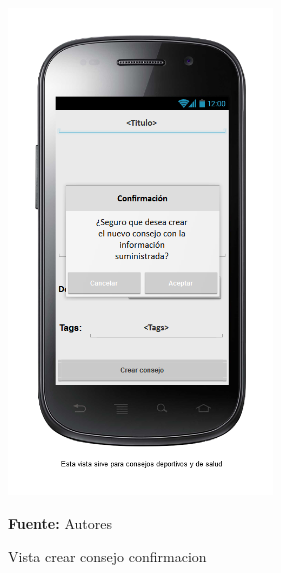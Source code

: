 \begin{figure}[!htb]
  \begin{center}
\includegraphics[width=7cm]{./imagenes/UI/Contenidos/crear_consejo_confirmacion.png}
    \caption{Vista crear consejo confirmacion}
    \label{fig:Vista_crear_consejo_confirmacion}
    \textbf{Fuente:}  Autores
  \end{center}
\end{figure}
